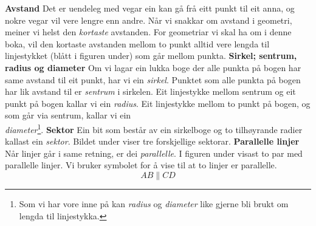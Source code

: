 \newpage
{}
\newpage
\textbf{Avstand}\os
Det er uendeleg med vegar ein kan gå frå eitt punkt til eit anna, og nokre vegar vil vere lengre enn andre. Når vi snakkar om avstand i geometri, meiner vi helst den \textsl{kortaste} avstanden. For geometriar vi skal ha om i denne boka, vil den kortaste avstanden mellom to punkt alltid vere lengda til linjestykket (blått i figuren under) som går mellom punkta.
\textbf{Sirkel; sentrum, radius og diameter} \os
Om vi lagar ein lukka boge der alle punkta på bogen har same avstand til eit punkt, har vi ein \textit{sirkel}. Punktet som alle punkta på bogen har lik avstand til er \textit{sentrum} i sirkelen. Eit linjestykke mellom sentrum og eit punkt på bogen kallar vi ein \textit{radius}. Eit linjestykke mellom to punkt på bogen, og som går via sentrum, kallar vi ein\\ \textit{diameter}\footnote{Som vi har vore inne på kan \textit{radius} og \textit{diameter} like gjerne bli brukt om lengda til linjestykka.}.
\textbf{Sektor} \os
Ein bit som består av ein sirkelboge og to tilhøyrande radier kallast ein \textit{sektor}. Bildet under viser tre forskjellige sektorar.
\newpage
\textbf{Parallelle linjer}\os
Når linjer går i same retning, er dei \textit{parallelle}. I figuren under visast to par med parallelle linjer.
Vi bruker symbolet \sym{$ \parallel $} for å vise til at to linjer er parallelle.
\[ AB\parallel CD \]


